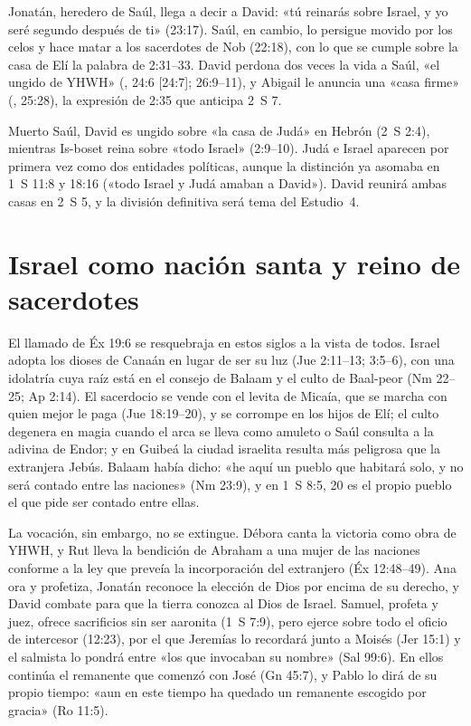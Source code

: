 Jonatán, heredero de Saúl, llega a decir a David: «tú reinarás sobre Israel, y yo seré segundo después de ti» (23:17). Saúl, en cambio, lo persigue movido por los celos y hace matar a los sacerdotes de Nob (22:18), con lo que se cumple sobre la casa de Elí la palabra de 2:31--33. David perdona dos veces la vida a Saúl, «el ungido de YHWH» (, 24:6 [24:7]; 26:9--11), y Abigail le anuncia una «casa firme» (, 25:28), la expresión de 2:35 que anticipa 2~S 7.

Muerto Saúl, David es ungido sobre «la casa de Judá» en Hebrón (2~S 2:4), mientras Is-boset reina sobre «todo Israel» (2:9--10). Judá e Israel aparecen por primera vez como dos entidades políticas, aunque la distinción ya asomaba en 1~S 11:8 y 18:16 («todo Israel y Judá amaban a David»). David reunirá ambas casas en 2~S 5, y la división definitiva será tema del Estudio~4.

\section{Israel como nación santa y reino de sacerdotes}

El llamado de Éx 19:6 se resquebraja en estos siglos a la vista de todos. Israel adopta los dioses de Canaán en lugar de ser su luz (Jue 2:11--13; 3:5--6), con una idolatría cuya raíz está en el consejo de Balaam y el culto de Baal-peor (Nm 22--25; Ap 2:14). El sacerdocio se vende con el levita de Micaía, que se marcha con quien mejor le paga (Jue 18:19--20), y se corrompe en los hijos de Elí; el culto degenera en magia cuando el arca se lleva como amuleto o Saúl consulta a la adivina de Endor; y en Guibeá la ciudad israelita resulta más peligrosa que la extranjera Jebús. Balaam había dicho: «he aquí un pueblo que habitará solo, y no será contado entre las naciones» (Nm 23:9), y en 1~S 8:5, 20 es el propio pueblo el que pide ser contado entre ellas.

La vocación, sin embargo, no se extingue. Débora canta la victoria como obra de YHWH, y Rut lleva la bendición de Abraham a una mujer de las naciones conforme a la ley que preveía la incorporación del extranjero (Éx 12:48--49). Ana ora y profetiza, Jonatán reconoce la elección de Dios por encima de su derecho, y David combate para que la tierra conozca al Dios de Israel. Samuel, profeta y juez, ofrece sacrificios sin ser aaronita (1~S 7:9), pero ejerce sobre todo el oficio de intercesor (12:23), por el que Jeremías lo recordará junto a Moisés (Jer 15:1) y el salmista lo pondrá entre «los que invocaban su nombre» (Sal 99:6). En ellos continúa el remanente que comenzó con José (Gn 45:7), y Pablo lo dirá de su propio tiempo: «aun en este tiempo ha quedado un remanente escogido por gracia» (Ro 11:5).

